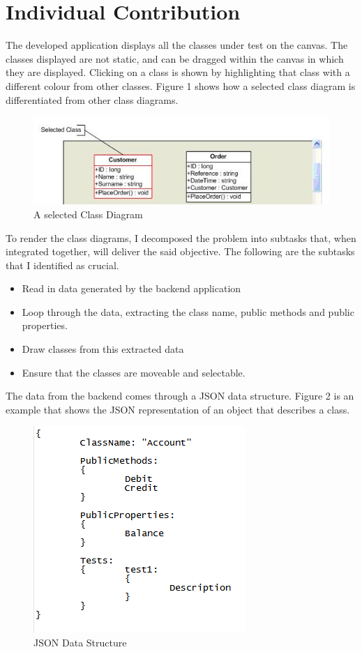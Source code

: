 \documentclass[titlepage,a4paper,11pt]{report}
\begin{document}
\section{Individual Contribution}
The developed application displays all the classes under test on the canvas. The classes displayed are not static, and can be dragged within the canvas in which they are displayed. Clicking on a class is shown by highlighting that class with a different colour from other classes. Figure 1 shows how a selected class diagram is differentiated from other class diagrams.
\begin{figure} [H]
\includegraphics[scale=0.8] {capture.png}
\caption{A selected Class Diagram}
\label{mdp}
\end{figure}

To render the class diagrams, I decomposed the problem into subtasks that, when integrated together, will deliver the said objective. The following are the subtasks that I identified as crucial.
\begin{itemize}
\item Read in data generated by the backend application
\item Loop through the data, extracting the class name, public methods and public properties.
\item Draw classes from this extracted data
\item Ensure that the classes are moveable and selectable.
\end{itemize}
The data from the backend comes through a JSON data structure. Figure 2 is an example that shows the JSON representation of an object that describes a class.
\begin{figure} [H]
\includegraphics[scale=0.8] {capture1.png}
\caption{JSON Data Structure}
\label{json}
\end{figure}
\end{document}
